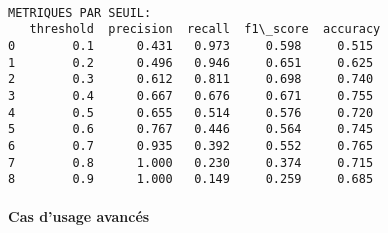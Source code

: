 \documentclass[11pt]{article}
\begin{document}
    \begin{Verbatim}[commandchars=\\\{\}]

METRIQUES PAR SEUIL:
   threshold  precision  recall  f1\_score  accuracy
0        0.1      0.431   0.973     0.598     0.515
1        0.2      0.496   0.946     0.651     0.625
2        0.3      0.612   0.811     0.698     0.740
3        0.4      0.667   0.676     0.671     0.755
4        0.5      0.655   0.514     0.576     0.720
5        0.6      0.767   0.446     0.564     0.745
6        0.7      0.935   0.392     0.552     0.765
7        0.8      1.000   0.230     0.374     0.715
8        0.9      1.000   0.149     0.259     0.685
    \end{Verbatim}

    \paragraph{Cas d'usage avancés}\label{cas-dusage-avancuxe9s}
\end{document}
